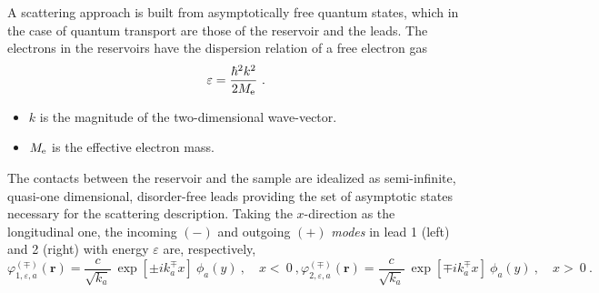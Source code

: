 \documentclass[a4paper,10pt]{article}
\newcommand{\br}{\mathbf{r}}
\def\Me{M_{\rm e}}
\begin{document}
A scattering approach is built from asymptotically free quantum states, which in the case of quantum transport are those of the reservoir and the leads. The electrons in the reservoirs have the dispersion relation of a free electron gas 
\begin{equation}
\varepsilon=\frac{\hbar^2 k^{2}}{2\Me} \ .
\end{equation}
\begin{itemize}

\item $k$ is the magnitude of the two-dimensional wave-vector. 

\item $\Me$ is the effective electron mass. 

\end{itemize}
The contacts between the reservoir and the sample are idealized as semi-infinite, quasi-one dimensional, disorder-free leads providing the set of asymptotic states necessary for the scattering description. Taking the $x$-direction as the longitudinal one, the incoming $(-)$ and outgoing $(+)$ {\it modes} in lead 1 (left) and 2 (right) with energy $\varepsilon$ are, respectively,
\begin{subequations}
\label{allleadst} 
\begin{equation}
\varphi_{1,\varepsilon,a}^{(\mp)}(\br)  =  
\frac{c}{\sqrt{k_{a}}} \ \exp{[\pm i k_{a}^\mp x]}
\ \phi_{a}(y) \ , \quad x <  \ 0 \ ,
\end{equation}
\begin{equation}
\varphi_{2,\varepsilon,a}^{(\mp)}(\br)  =  
\frac{c}{\sqrt{k_{a}}} \ \exp{[\mp i k_{a}^\mp x]} 
\ \phi_{a}(y) \ , \quad x >  \ 0 \ .
\end{equation}
\end{subequations}
\end{document}
